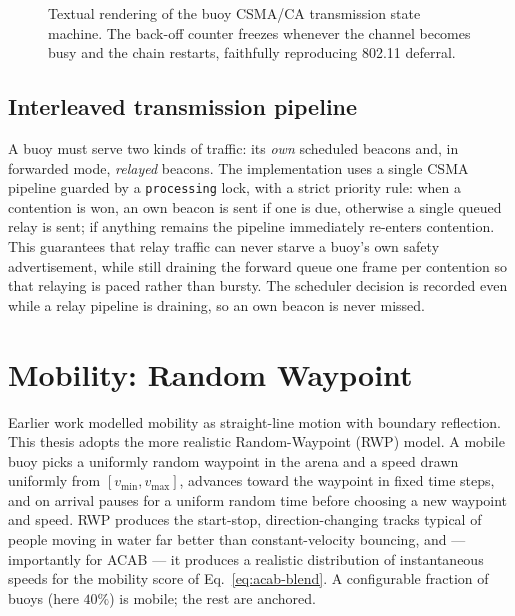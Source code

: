 \documentclass[12pt,a4paper,oneside]{report}
\begin{document}
\begin{figure}[t]
\centering
{}
\caption{Textual rendering of the buoy CSMA/CA transmission state machine. The
back-off counter freezes whenever the channel becomes busy and the chain
restarts, faithfully reproducing 802.11 deferral.}
\label{fig:fsm-desc}
\end{figure}

\subsection{Interleaved transmission pipeline}
A buoy must serve two kinds of traffic: its \emph{own} scheduled beacons and, in
forwarded mode, \emph{relayed} beacons. The implementation uses a single CSMA
pipeline guarded by a \texttt{processing} lock, with a strict priority rule:
when a contention is won, an own beacon is sent if one is due, otherwise a single
queued relay is sent; if anything remains the pipeline immediately re-enters
contention. This guarantees that relay traffic can never starve a buoy's own
safety advertisement, while still draining the forward queue one frame per
contention so that relaying is paced rather than bursty. The scheduler decision
is recorded even while a relay pipeline is draining, so an own beacon is never
missed.

\section{Mobility: Random Waypoint}
Earlier work modelled mobility as straight-line motion with boundary reflection.
This thesis adopts the more realistic Random-Waypoint (RWP) model. A mobile buoy
picks a uniformly random waypoint in the arena and a speed drawn uniformly from
$[v_{\min},v_{\max}]$, advances toward the waypoint in fixed time steps, and on
arrival pauses for a uniform random time before choosing a new waypoint and
speed. RWP produces the start-stop, direction-changing tracks typical of people
moving in water far better than constant-velocity bouncing, and --- importantly
for ACAB --- it produces a realistic distribution of instantaneous speeds for
the mobility score of Eq.~\ref{eq:acab-blend}. A configurable fraction of buoys
(here $40\%$) is mobile; the rest are anchored.
\end{document}
